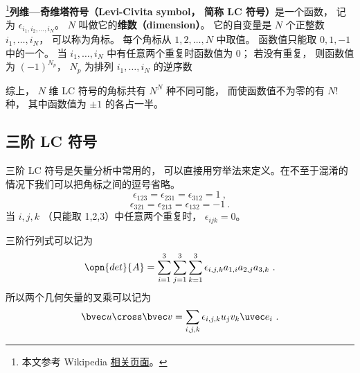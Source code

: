 

\footnote{本文参考 Wikipedia \href{https://en.wikipedia.org/wiki/Levi-Civita_symbol}{相关页面}。}\textbf{列维—奇维塔符号（Levi-Civita symbol， 简称 LC 符号）}是一个函数， 记为 $\epsilon_{i_1, i_2, \dots, i_N}$。 $N$ 叫做它的\textbf{维数（dimension）}。 它的自变量是 $N$ 个正整数 $i_1, \dots, i_N$， 可以称为角标。 每个角标从 $1, 2, \dots, N$ 中取值。 函数值只能取 $0, 1, -1$ 中的一个。 当 $i_1, \dots, i_N$ 中有任意两个重复时函数值为 0； 若没有重复， 则函数值为 $(-1)^{N_p}$， $N_p$ 为排列 $i_1, \dots, i_N$ 的逆序数

综上， $N$ 维 LC 符号的角标共有 $N^N$ 种不同可能， 而使函数值不为零的有 $N!$ 种， 其中函数值为 $\pm 1$ 的各占一半。

\subsection{三阶 LC 符号}
三阶 LC 符号是矢量分析中常用的， 可以直接用穷举法来定义。在不至于混淆的情况下我们可以把角标之间的逗号省略。
\begin{equation}
\epsilon_{123} = \epsilon_{231} = \epsilon_{312} = 1~,
\end{equation}
\begin{equation}
\epsilon_{321} = \epsilon_{213} = \epsilon_{132} = -1~.
\end{equation}
当 $i,j,k$ （只能取 1,2,3）中任意两个重复时， $\epsilon_{ijk} = 0$。

三阶行列式可以记为
\begin{equation}
\opn{det}{A} = \sum_{i = 1}^3 \sum_{j = 1}^3 \sum_{k = 1}^3 \epsilon_{i,j,k} a_{1,i} a_{2,j} a_{3,k}~.
\end{equation}
所以两个几何矢量的叉乘可以记为
\begin{equation}
\bvec u \cross \bvec v = \sum_{i,j,k} \epsilon_{i,j,k} u_j v_k \uvec e_i~.
\end{equation}
